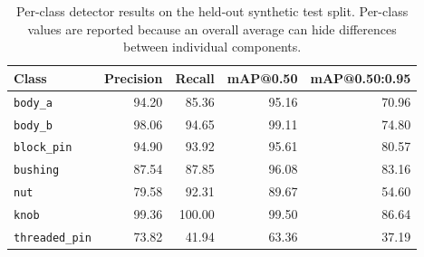 \begin{table}[htbp]
\centering
\caption{Per-class detector results on the held-out synthetic test split. Per-class values are reported because an overall average can hide differences between individual components.}
\label{tab:test-split-per-class}
\begin{tabular}{|l|r|r|r|r|}
\hline
\textbf{Class} & \textbf{Precision} & \textbf{Recall} & \textbf{mAP@0.50} & \textbf{mAP@0.50:0.95} \\
\hline
\texttt{body\_a} & 94.20 & 85.36 & 95.16 & 70.96 \\
\hline
\texttt{body\_b} & 98.06 & 94.65 & 99.11 & 74.80 \\
\hline
\texttt{block\_pin} & 94.90 & 93.92 & 95.61 & 80.57 \\
\hline
\texttt{bushing} & 87.54 & 87.85 & 96.08 & 83.16 \\
\hline
\texttt{nut} & 79.58 & 92.31 & 89.67 & 54.60 \\
\hline
\texttt{knob} & 99.36 & 100.00 & 99.50 & 86.64 \\
\hline
\texttt{threaded\_pin} & 73.82 & 41.94 & 63.36 & 37.19 \\
\hline
\end{tabular}
\end{table}
